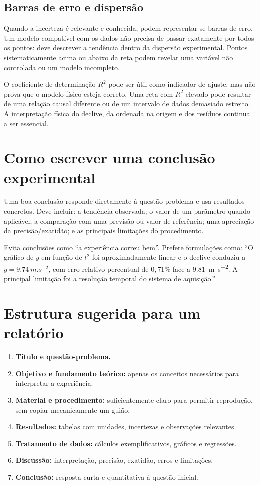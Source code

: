 \documentclass[11pt,a4paper,openany]{book}
\begin{document}
\subsection{Barras de erro e dispersão}
Quando a incerteza é relevante e conhecida, podem representar-se barras de erro. Um modelo compatível com os dados não precisa de passar exatamente por todos os pontos: deve descrever a tendência dentro da dispersão experimental. Pontos sistematicamente acima ou abaixo da reta podem revelar uma variável não controlada ou um modelo incompleto.

\begin{nota}
O coeficiente de determinação $R^2$ pode ser útil como indicador de ajuste, mas não prova que o modelo físico esteja correto. Uma reta com $R^2$ elevado pode resultar de uma relação causal diferente ou de um intervalo de dados demasiado estreito. A interpretação física do declive, da ordenada na origem e dos resíduos continua a ser essencial.
\end{nota}

\section{Como escrever uma conclusão experimental}
Uma boa conclusão responde diretamente à questão-problema e usa resultados concretos. Deve incluir: a tendência observada; o valor de um parâmetro quando aplicável; a comparação com uma previsão ou valor de referência; uma apreciação da precisão/exatidão; e as principais limitações do procedimento.

\begin{essencial}
Evita conclusões como ``a experiência correu bem''. Prefere formulações como: ``O gráfico de $y$ em função de $t^2$ foi aproximadamente linear e o declive conduziu a $g=\SI{9.74}{m.s^{-2}}$, com erro relativo percentual de $0,71\%$ face a \SI{9.81}{m.s^{-2}}. A principal limitação foi a resolução temporal do sistema de aquisição.''
\end{essencial}

\section{Estrutura sugerida para um relatório}
\begin{enumerate}
\item \textbf{Título e questão-problema.}
\item \textbf{Objetivo e fundamento teórico:} apenas os conceitos necessários para interpretar a experiência.
\item \textbf{Material e procedimento:} suficientemente claro para permitir reprodução, sem copiar mecanicamente um guião.
\item \textbf{Resultados:} tabelas com unidades, incertezas e observações relevantes.
\item \textbf{Tratamento de dados:} cálculos exemplificativos, gráficos e regressões.
\item \textbf{Discussão:} interpretação, precisão, exatidão, erros e limitações.
\item \textbf{Conclusão:} resposta curta e quantitativa à questão inicial.
\end{enumerate}
\end{document}
